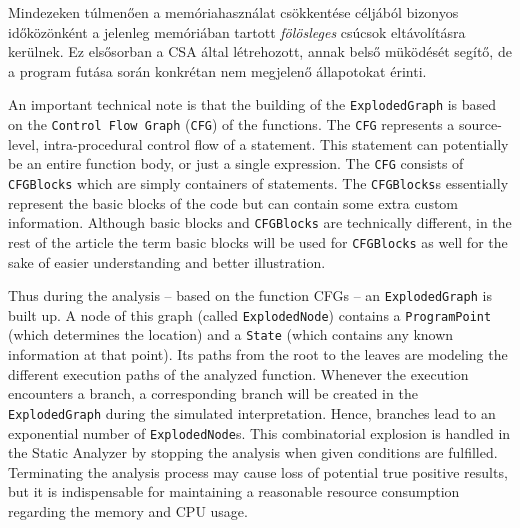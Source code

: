 \documentclass[oneside, a4paper, 12pt]{article}
\theoremstyle{definition}
\begin{document}
Mindezeken túlmenően a memóriahasználat csökkentése céljából bizonyos
időközönként a jelenleg memóriában tartott \textit{fölösleges} csúcsok
eltávolításra kerülnek. Ez elsősorban a CSA által létrehozott, annak belső
müködését segítő, de a program futása során konkrétan nem megjelenő
állapotokat érinti.

An important technical note is that the building 
of the \texttt{ExplodedGraph} is based on the \texttt{Control Flow Graph} 
(\texttt{CFG}) of the functions. The \texttt{CFG} represents a source-level, 
intra-procedural control flow of a 
statement. This statement can potentially be an entire function body, or just a 
single expression. The \texttt{CFG} consists of \texttt{CFGBlocks} which are 
simply containers of statements. The \texttt{CFGBlocks}s essentially represent 
the basic blocks of the code but can contain some extra custom information. 
Although basic blocks and \texttt{CFGBlocks} are technically different, in the 
rest of the article the term basic blocks will be used for \texttt{CFGBlocks} 
as well for the sake of easier understanding and better illustration.

Thus during the analysis -- based on the function CFGs -- an 
\texttt{ExplodedGraph} is built up. A 
node of this graph (called \texttt{ExplodedNode}) contains a 
\texttt{ProgramPoint} (which determines the location) and a \texttt{State} 
(which contains any known information at that point). Its paths from the root 
to the leaves are modeling the different execution paths of the analyzed 
function. Whenever the execution encounters a branch, a corresponding branch 
will be created in the \texttt{ExplodedGraph} during the simulated 
interpretation.
Hence, branches lead to an exponential number of \texttt{ExplodedNode}s.
This combinatorial explosion is handled in the Static Analyzer by stopping 
the analysis when given conditions are fulfilled. Terminating the analysis 
process may cause loss of potential true positive results, but it is 
indispensable for maintaining a reasonable resource consumption regarding the 
memory and CPU usage. 
\end{document}
